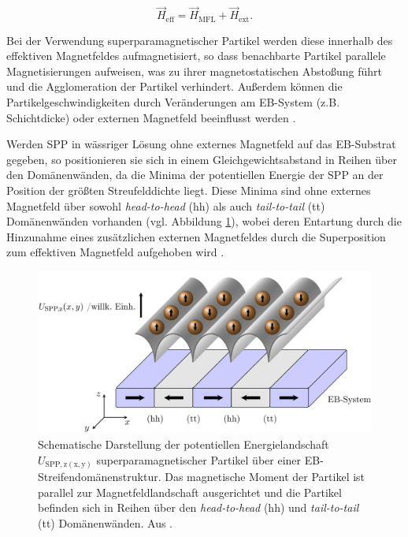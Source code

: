\documentclass[page,pdftex,12pt,a4paper,twoside,openright]{scrbook}
\begin{document}
\begin{equation}
\vec{H}_\mathrm{eff} = \vec{H}_\mathrm{MFL} + \vec{H}_\mathrm{ext}.
\end{equation}

Bei der Verwendung superparamagnetischer Partikel werden diese innerhalb des effektiven Magnetfeldes aufmagnetisiert, so dass benachbarte Partikel parallele Magnetisierungen aufweisen, was zu ihrer magnetostatischen Abstoßung führt und die Agglomeration der Partikel verhindert. Außerdem können die Partikelgeschwindigkeiten durch Veränderungen am EB-System (z.B. Schichtdicke) oder externen Magnetfeld beeinflusst werden \cite{holzinger_directed_2015}.

Werden SPP in wässriger Lösung ohne externes Magnetfeld auf das EB-Substrat gegeben, so positionieren sie sich in einem Gleichgewichtsabstand in Reihen über den Domänenwänden, da die Minima der potentiellen Energie der SPP an der Position der größten Streufelddichte liegt. Diese Minima sind ohne externes Magnetfeld über sowohl \emph{head-to-head} (hh) als auch \emph{tail-to-tail} (tt) Domänenwänden vorhanden (vgl. Abbildung \ref{fig-mfl}), wobei deren Entartung durch die Hinzunahme eines zusätzlichen externen Magnetfeldes durch die Superposition zum effektiven Magnetfeld aufgehoben wird \cite{holzinger_directed_2015}.

\begin{figure}[h]
\centering
\includegraphics[width=.5\textwidth]{img/mfl.png}
\caption{\label{fig-mfl}
Schematische Darstellung der potentiellen Energielandschaft \(U_\mathrm{SPP,z(x,y)}\) superparamagnetischer Partikel über einer EB-Streifendomänenstruktur. Das magnetische Moment der Partikel ist parallel zur Magnetfeldlandschaft ausgerichtet und die Partikel befinden sich in Reihen über den \emph{head-to-head} (hh) und \emph{tail-to-tail} (tt) Domänenwänden. Aus \cite{holzinger_transport_2015}.}
\end{figure}
\end{document}
